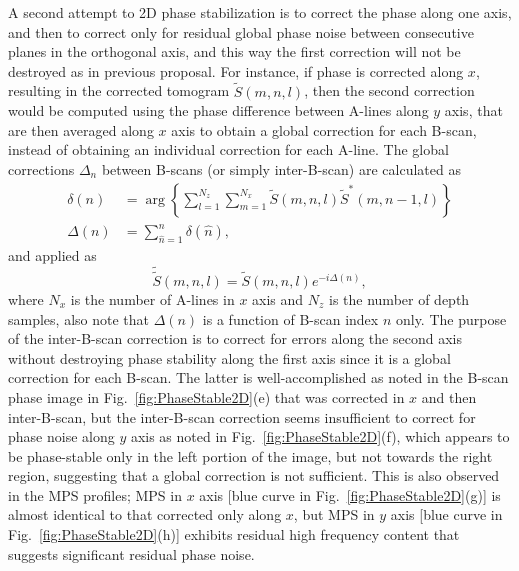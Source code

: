 
A second attempt to 2D phase stabilization is to correct the phase along one axis, and then to correct only for residual global phase noise between consecutive planes in the orthogonal axis, and this way the first correction will not be destroyed as in previous proposal. For instance, if phase is corrected along $x$, resulting in the corrected tomogram $\tilde{S}(m,n,l)$, then the second correction would be computed using the phase difference between A-lines along $y$ axis, that are then averaged along $x$ axis to obtain a global correction for each B-scan, instead of obtaining an individual correction for each A-line. The global corrections $\Delta_n$ between B-scans (or simply inter-B-scan) are calculated as
\begin{align}
    \delta(n) &= \arg\left\{\sum_{l=1}^{N_z} \sum_{m=1}^{N_x} \tilde{S}(m,n,l) \tilde{S}^*(m,n-1,l)\right\} \nonumber\\
    \Delta(n) &= \sum_{\hat{n} = 1}^n\delta(\hat{n}),
\end{align}
and applied as
\begin{equation}
    \tilde{\tilde{S}}(m,n,l) = \tilde{S}(m,n,l) e^{-i\Delta(n)},
\end{equation}
where $N_x$ is the number of A-lines in $x$ axis and $N_z$ is the number of depth samples, also note that $\Delta(n)$ is a function of B-scan index $n$ only. The purpose of the inter-B-scan correction is to correct for errors along the second axis without destroying phase stability along the first axis since it is a global correction for each B-scan. The latter is well-accomplished as noted in the B-scan phase image in Fig.~\ref{fig:PhaseStable2D}(e) that was corrected in $x$ and then inter-B-scan, but the inter-B-scan correction seems insufficient to correct for phase noise along $y$ axis as noted in Fig.~\ref{fig:PhaseStable2D}(f), which appears to be phase-stable only in the left portion of the image, but not towards the right region, suggesting that a global correction is not sufficient. This is also observed in the MPS profiles; MPS in $x$ axis [blue curve in Fig.~\ref{fig:PhaseStable2D}(g)] is almost identical to that corrected only along $x$, but MPS in $y$ axis [blue curve in Fig.~\ref{fig:PhaseStable2D}(h)] exhibits residual high frequency content that suggests significant residual phase noise.

